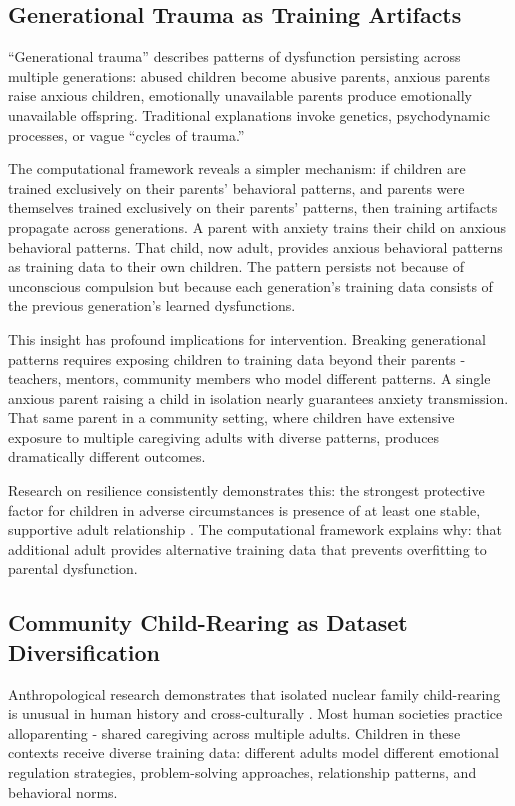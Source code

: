 \documentclass{article}
\begin{document}
\subsection{Generational Trauma as Training Artifacts}

``Generational trauma'' describes patterns of dysfunction persisting across multiple generations: abused children become abusive parents, anxious parents raise anxious children, emotionally unavailable parents produce emotionally unavailable offspring. Traditional explanations invoke genetics, psychodynamic processes, or vague ``cycles of trauma.''

The computational framework reveals a simpler mechanism: if children are trained exclusively on their parents' behavioral patterns, and parents were themselves trained exclusively on their parents' patterns, then training artifacts propagate across generations. A parent with anxiety trains their child on anxious behavioral patterns. That child, now adult, provides anxious behavioral patterns as training data to their own children. The pattern persists not because of unconscious compulsion but because each generation's training data consists of the previous generation's learned dysfunctions.

This insight has profound implications for intervention. Breaking generational patterns requires exposing children to training data beyond their parents - teachers, mentors, community members who model different patterns. A single anxious parent raising a child in isolation nearly guarantees anxiety transmission. That same parent in a community setting, where children have extensive exposure to multiple caregiving adults with diverse patterns, produces dramatically different outcomes.

Research on resilience consistently demonstrates this: the strongest protective factor for children in adverse circumstances is presence of at least one stable, supportive adult relationship \cite{masten2001}. The computational framework explains why: that additional adult provides alternative training data that prevents overfitting to parental dysfunction.

\subsection{Community Child-Rearing as Dataset Diversification}

Anthropological research demonstrates that isolated nuclear family child-rearing is unusual in human history and cross-culturally \cite{hrdy2009}. Most human societies practice alloparenting - shared caregiving across multiple adults. Children in these contexts receive diverse training data: different adults model different emotional regulation strategies, problem-solving approaches, relationship patterns, and behavioral norms.
\end{document}
